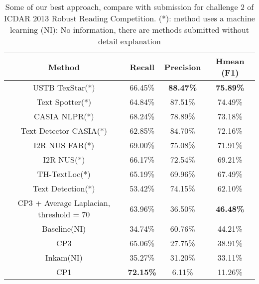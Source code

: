 \begin {table}[H]
\caption{Some of our best approach, compare with submission for challenge 2 of ICDAR 2013 Robust Reading Competition. (*): method uses a machine learning (NI): No information, there are methods submitted without detail explanation}\label{tab:Comparation} 
\begin{tabular}{|c|c|c|c|}
\hline 
\textbf{Method} & \textbf{Recall} & \textbf{Precision} & \textbf{Hmean (F1)} \\ 
\hline 
USTB TexStar(*) & 66.45\% & \textbf{88.47\%} & \textbf{75.89\%} \\ 
\hline 
Text Spotter(*) & 64.84\% & 87.51\% & 74.49\% \\ 
\hline 
CASIA NLPR(*)  & 68.24\% & 78.89\% & 73.18\% \\ 
\hline 
Text Detector CASIA(*) & 62.85\% & 84.70\% & 72.16\% \\ 
\hline 
I2R NUS FAR(*) & 69.00\% & 75.08\% & 71.91\% \\ 
\hline 
I2R NUS(*) & 66.17\% & 72.54\% & 69.21\% \\ 
\hline 
TH-TextLoc(*) & 65.19\% & 69.96\% & 67.49\% \\ 
\hline 
Text Detection(*) & 53.42\% & 74.15\% & 62.10\% \\ 
\hline 
CP3 + Average Laplacian, threshold = 70 & 63.96\% & 36.50\% & \textbf{46.48\%} \\ 
\hline 
Baseline(NI) & 34.74\% & 60.76\% & 44.21\%\\ 
\hline 
CP3 & 65.06\% & 27.75\% & 38.91\% \\ 
\hline 
Inkam(NI) & 35.27\% & 31.20\% & 33.11\% \\ 
\hline 
CP1 &\textbf{ \textbf{72.15\%}} & 6.11\% & 11.26\% \\
\hline 
\end{tabular} 

\end{table}








